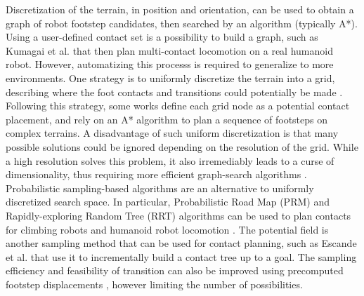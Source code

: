 Discretization of the terrain, in position and orientation, can be used to obtain a graph of robot footstep candidates, then searched by an algorithm (typically A*).
Using a user-defined contact set is a possibility to build a graph, such as Kumagai et al. \cite{kumagai_2020} that then plan multi-contact locomotion on a real humanoid robot. 
However, automatizing this processs is required to generalize to more environments.
One strategy is to uniformly discretize the terrain into a grid, describing where the foot contacts and transitions could potentially be made \cite{abdul_karim_2012}. 
Following this strategy, some works \cite{chestnutt_laser_2012, griffin_rough_terrain_grid_2019} define each grid node as a potential contact placement, and rely on an A* algorithm to plan a sequence of footsteps on complex terrains.
A disadvantage of such uniform discretization is that many possible solutions could be ignored depending on the resolution of the grid. While a high resolution solves this problem, it also irremediably leads to a curse of dimensionality, thus requiring more efficient graph-search algorithms \cite{Vernaza2009SearchbasedPF, Zucker_thesis_2010, ara_r_hornung_2012, castro_2019}.
Probabilistic sampling-based algorithms are an alternative to uniformly discretized search space.
In particular, Probabilistic Road Map (PRM) \cite{prm_1996} and Rapidly-exploring Random Tree (RRT) \cite{RRT_1998} algorithms can be used to plan contacts for climbing robots \cite{bretl2006} and humanoid robot locomotion \cite{hauser_bretl_2008, perrin_2012, ferrari_thesis_2021}.
The potential field is another sampling method that can be used for contact planning, such as Escande et al. \cite{escande_2006} that use it to incrementally build a contact tree up to a goal. %
The sampling efficiency and feasibility of transition can also be improved using precomputed footstep displacements \cite{Chestnutt2003, baudouin_perrin_2011}, however limiting the number of possibilities.

